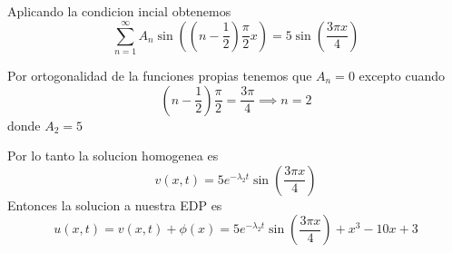 \documentclass[../main.tex]{subfiles}
\begin{document}
\begin{solution}
  Aplicando la condicion incial obtenemos
  \begin{equation*}
      \sum_{n = 1}^{\infty} A_{n}\sin((n - \frac12) \frac{\pi}{2}x) = 5 \sin(\frac{3\pi x}{4})
  \end{equation*}

  Por ortogonalidad de la funciones propias tenemos que $A_{n} = 0$ excepto cuando
  \begin{equation*}
    (n - \frac{1}{2})\frac{\pi}{2} = \frac{3\pi}{4} \implies n = 2
  \end{equation*}
  donde $A_{2} = 5$

  Por lo tanto la solucion homogenea es
  \begin{equation*}
    v(x, t) = 5 e^{-\lambda_{2} t}\sin(\frac{3 \pi x}{4})
  \end{equation*}
Entonces la solucion a nuestra EDP es
\begin{equation*}
  u(x, t) = v(x, t) + \phi(x) = 5 e^{-\lambda_{2} t}\sin(\frac{3 \pi x}{4}) + x^{3} - 10x + 3
\end{equation*}
\end{solution}
\end{document}
